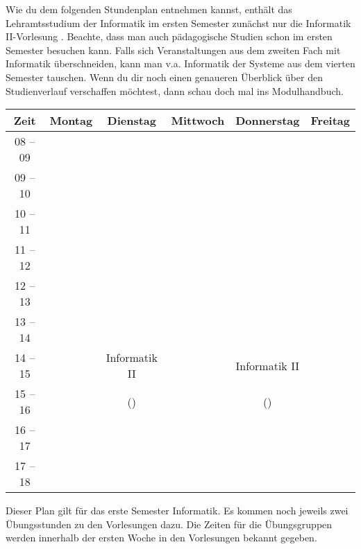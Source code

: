 Wie du dem folgenden Stundenplan entnehmen kannst, enthält das Lehramtsstudium der Informatik im ersten Semester zunächst nur die Informatik II-Vorlesung . %
Beachte, dass man auch pädagogische Studien schon im ersten Semester besuchen kann. Falls sich Veranstaltungen aus dem zweiten
Fach mit Informatik überschneiden, kann man v.a. Informatik der Systeme aus dem vierten Semester tauschen.
Wenn du dir noch einen genaueren Überblick über den Studienverlauf verschaffen möchtest, dann schau doch mal ins Modulhandbuch.

\begin{center}
	\begin{tabular}{|c|c|c|c|c|c|} \hline
		Zeit      & 	Montag 		& Dienstag			& Mittwoch 			& Donnerstag 		& Freitag	 \\\hline\hline
		08 -- 09  &					& 					&					& 					&			\\\hline
		09 -- 10  & 				& 					& 					& 					&			\\\hline
		10 -- 11  &					& 					&					& 					&			\\\hline
		11 -- 12  & 				&  					&					&			 		& 			\\\hline
		12 -- 13  & 				& 				 	& 				    & 					& 			 \\\hline
		13 -- 14  & 				& 					& 					& 					& 			 \\\hline
		14 -- 15  & 				& Informatik II 	& 					& Informatik II 	& 				\\\cline{1-2}\cline{4-4}\cline{6-6}
		15 -- 16  &					& (\Infoprof) 		& 					& (\Infoprof) 		& 				\\\hline
		16 -- 17  & 				& 					& 					& 					&\\\hline
		17 -- 18  & 				& 					& 					& 					& \\
		\hline
	\end{tabular}


\end{center}

Dieser Plan gilt für das erste Semester Informatik. Es kommen noch jeweils zwei Übungsstunden zu den Vorlesungen dazu.
Die Zeiten für die Übungsgruppen werden innerhalb der ersten Woche in den Vorlesungen bekannt gegeben.\\
